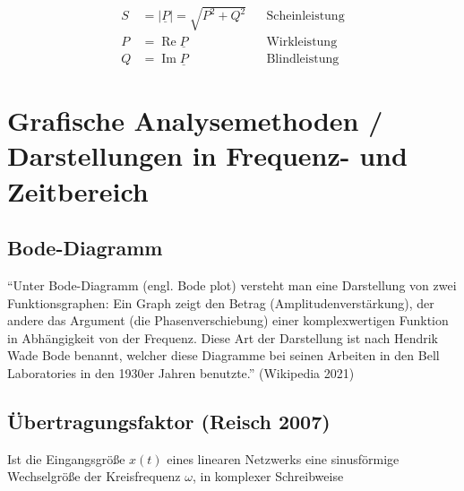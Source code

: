 \documentclass[
  ngerman,
  letterpaper,
]{scrbook}
\begin{document}
\begin{tcolorbox}[enhanced jigsaw, titlerule=0mm, rightrule=.15mm, toprule=.15mm, colback=white, toptitle=1mm, bottomrule=.15mm, coltitle=black, leftrule=.75mm, arc=.35mm, colbacktitle=quarto-callout-note-color!10!white, opacityback=0, bottomtitle=1mm, colframe=quarto-callout-note-color-frame, opacitybacktitle=0.6, breakable, title=\textcolor{quarto-callout-note-color}{\faInfo}\hspace{0.5em}{Eigenschaften}, left=2mm]

\begin{align}
S &= \lvert\underline{P}\lvert = \sqrt{P^2 + Q^2} & &\mbox{Scheinleistung} \\
P &= \operatorname{Re}{\underline{P}} & &\mbox{Wirkleistung} \\
Q &= \operatorname{Im}{\underline{P}} & &\mbox{Blindleistung}
\end{align}

\end{tcolorbox}

\chapter{Grafische Analysemethoden / Darstellungen in Frequenz- und
Zeitbereich}\label{grafische-analysemethoden-darstellungen-in-frequenz--und-zeitbereich}

\section{Bode-Diagramm}\label{bode-diagramm}

``Unter Bode-Diagramm (engl. Bode plot) versteht man eine Darstellung
von zwei Funktionsgraphen: Ein Graph zeigt den Betrag
(Amplitudenverstärkung), der andere das Argument (die
Phasenverschiebung) einer komplexwertigen Funktion in Abhängigkeit von
der Frequenz. Diese Art der Darstellung ist nach Hendrik Wade Bode
benannt, welcher diese Diagramme bei seinen Arbeiten in den Bell
Laboratories in den 1930er Jahren benutzte.'' (Wikipedia 2021)

\section{Übertragungsfaktor (Reisch
2007)}\label{uxfcbertragungsfaktor-reisch2007}

Ist die Eingangsgröße \(x(t)\) eines linearen Netzwerks eine
sinusförmige Wechselgröße der Kreisfrequenz \(\omega\), in komplexer
Schreibweise
\end{document}
